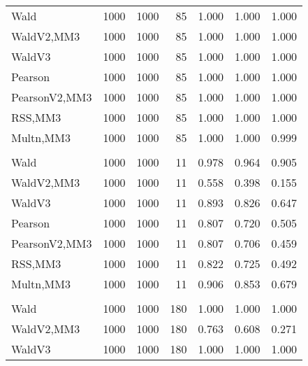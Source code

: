 \documentclass[
]{article}
\begin{document}
\begin{table}[H]
{\begin{tabular}[t]{lrrrrrr}
\hspace{1em}Wald & 1000 & 1000 & 85 & 1.000 & 1.000 & 1.000\\
\hspace{1em}WaldV2,MM3 & 1000 & 1000 & 85 & 1.000 & 1.000 & 1.000\\
\hspace{1em}WaldV3 & 1000 & 1000 & 85 & 1.000 & 1.000 & 1.000\\
\hspace{1em}Pearson & 1000 & 1000 & 85 & 1.000 & 1.000 & 1.000\\
\hspace{1em}PearsonV2,MM3 & 1000 & 1000 & 85 & 1.000 & 1.000 & 1.000\\
\hspace{1em}RSS,MM3 & 1000 & 1000 & 85 & 1.000 & 1.000 & 1.000\\
\hspace{1em}Multn,MM3 & 1000 & 1000 & 85 & 1.000 & 1.000 & 0.999\\
\addlinespace[0.3em]
\multicolumn{7}{l}{\textbf{2F 10V}}\\
\hspace{1em}Wald & 1000 & 1000 & 11 & 0.978 & 0.964 & 0.905\\
\hspace{1em}WaldV2,MM3 & 1000 & 1000 & 11 & 0.558 & 0.398 & 0.155\\
\hspace{1em}WaldV3 & 1000 & 1000 & 11 & 0.893 & 0.826 & 0.647\\
\hspace{1em}Pearson & 1000 & 1000 & 11 & 0.807 & 0.720 & 0.505\\
\hspace{1em}PearsonV2,MM3 & 1000 & 1000 & 11 & 0.807 & 0.706 & 0.459\\
\hspace{1em}RSS,MM3 & 1000 & 1000 & 11 & 0.822 & 0.725 & 0.492\\
\hspace{1em}Multn,MM3 & 1000 & 1000 & 11 & 0.906 & 0.853 & 0.679\\
\addlinespace[0.3em]
\multicolumn{7}{l}{\textbf{3F 15V}}\\
\hspace{1em}Wald & 1000 & 1000 & 180 & 1.000 & 1.000 & 1.000\\
\hspace{1em}WaldV2,MM3 & 1000 & 1000 & 180 & 0.763 & 0.608 & 0.271\\
\hspace{1em}WaldV3 & 1000 & 1000 & 180 & 1.000 & 1.000 & 1.000\\

\end{tabular}}
\end{table}
\end{document}
